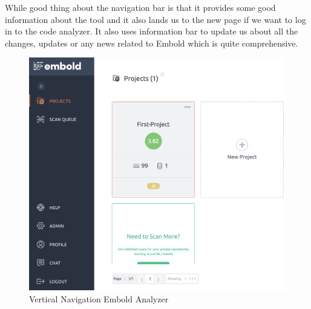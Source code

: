 While good thing about the navigation bar is that it provides some good information about the tool and it also lands us to the new page if we want to log in to the code analyzer. It also uses information bar to update us about all the changes, updates or any news related to Embold which is quite comprehensive.
\begin{figure}[htbp]
\begin{center}
\includegraphics[width=6.5 in, height=3 in]{vertical.png}
\caption{Vertical Navigation Embold Analyzer}
\label{fig:vertical}
\end{center}
\end{figure}

